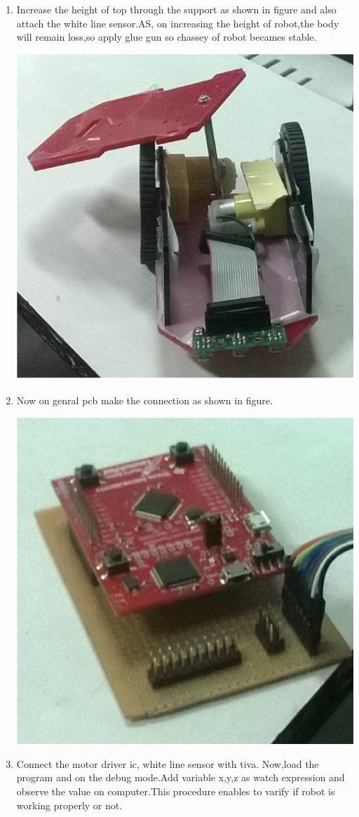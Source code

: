 \documentclass[a4paper,12pt,oneside]{book}
\begin{document}
\begin{enumerate}
\item Increase the height of top through the support as shown in figure and also attach the white line sensor.AS, on increasing the height of robot,the body will remain loss,so apply glue gun so chassey of robot becames stable.

\includegraphics[width=400 px]{img6.png}



\item Now on genral pcb make the connection as shown in figure.

\includegraphics[width=300 px]{img7.png}

\item Connect the motor driver ic, white line sensor with tiva. Now,load the program and on the debug mode.Add variable x,y,z as watch expression and observe the value on computer.This procedure enables to varify if robot is working properly or not. 


\end{enumerate}
\end{document}
